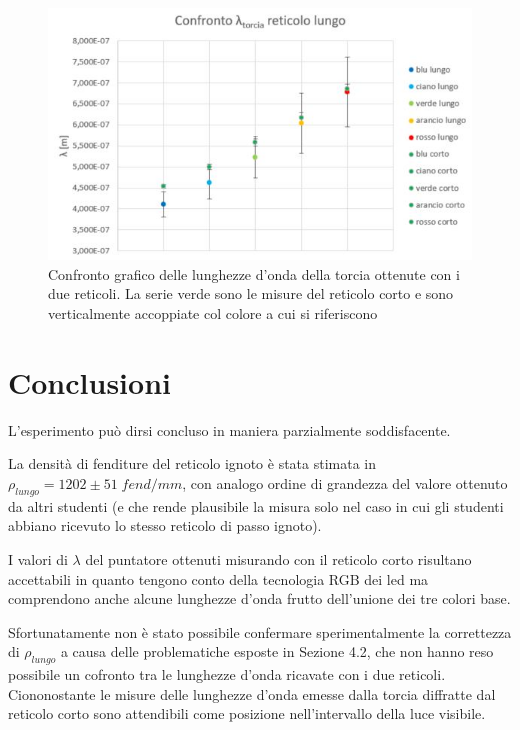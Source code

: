 \documentclass{article}
\begin{document}
\begin{figure}
    \centering
    \includegraphics[width=0.6\linewidth]{Confronto_graph.JPG}
    \caption{Confronto grafico delle lunghezze d'onda della torcia ottenute con i due reticoli. La serie verde sono le misure del reticolo corto e sono verticalmente accoppiate col colore a cui si riferiscono}
    \label{confrontotraidue}
\end{figure}

\section{Conclusioni}

L'esperimento può dirsi concluso in maniera parzialmente soddisfacente.

\vspace{3mm}

La densità di fenditure del reticolo ignoto è stata stimata in $\rho_{lungo} = 1202 \pm 51 \; fend/mm$, con analogo ordine di grandezza del valore ottenuto da altri studenti (e che rende plausibile la misura solo nel caso in cui gli studenti abbiano ricevuto lo stesso reticolo di passo ignoto). 

\vspace{3mm}

I valori di $\lambda$ del puntatore ottenuti misurando con il reticolo corto risultano accettabili in quanto tengono conto della tecnologia RGB dei led ma comprendono anche alcune lunghezze d'onda frutto dell'unione dei tre colori base.

\vspace{3mm}

Sfortunatamente non è stato possibile confermare sperimentalmente la correttezza di $\rho_{lungo}$ a causa delle problematiche esposte in Sezione 4.2, che non hanno reso possibile un cofronto tra le lunghezze d'onda ricavate con i due reticoli. Ciononostante le misure delle lunghezze d'onda emesse dalla torcia diffratte dal reticolo corto sono attendibili come posizione nell'intervallo della luce visibile.
\end{document}
